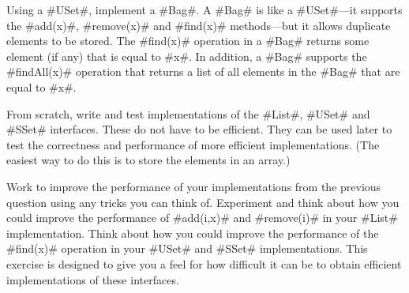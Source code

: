 \begin{exc}
  Using a #USet#, implement a #Bag#.  A #Bag# is like a #USet#---it
  supports the #add(x)#, #remove(x)# and #find(x)# methods---but it allows
  duplicate elements to be stored.  The #find(x)# operation in a #Bag#
  returns some element (if any) that is equal to #x#.  In addition,
  a #Bag# supports the #findAll(x)# operation that returns a list of
  all elements in the #Bag# that are equal to #x#.
\end{exc}

\begin{exc}
  From scratch, write and test implementations of the #List#, #USet#
  and #SSet# interfaces.  These do not have to be efficient.  They can
  be used later to test the correctness and performance of more efficient
  implementations.  (The easiest way to do this is to store the elements
  in an array.)
\end{exc}

\begin{exc}
  Work to improve the performance of your implementations from the
  previous question using any tricks you can think of.  Experiment and
  think about how you could improve the performance of #add(i,x)# and
  #remove(i)# in your #List# implementation.  Think about how you could
  improve the performance of the #find(x)# operation in your #USet#
  and #SSet# implementations.  This exercise is designed to give you a
  feel for  how difficult it can be to obtain efficient implementations
  of these interfaces.
\end{exc}




